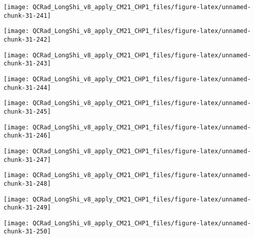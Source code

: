 \documentclass[
  10pt,
  a4paper,oneside]{article}
\begin{document}
\begin{center}\texttt{[image: QCRad\_LongShi\_v8\_apply\_CM21\_CHP1\_files/figure-latex/unnamed-chunk-31-241]} \end{center}

\begin{center}\texttt{[image: QCRad\_LongShi\_v8\_apply\_CM21\_CHP1\_files/figure-latex/unnamed-chunk-31-242]} \end{center}

\begin{center}\texttt{[image: QCRad\_LongShi\_v8\_apply\_CM21\_CHP1\_files/figure-latex/unnamed-chunk-31-243]} \end{center}

\begin{center}\texttt{[image: QCRad\_LongShi\_v8\_apply\_CM21\_CHP1\_files/figure-latex/unnamed-chunk-31-244]} \end{center}

\begin{center}\texttt{[image: QCRad\_LongShi\_v8\_apply\_CM21\_CHP1\_files/figure-latex/unnamed-chunk-31-245]} \end{center}

\begin{center}\texttt{[image: QCRad\_LongShi\_v8\_apply\_CM21\_CHP1\_files/figure-latex/unnamed-chunk-31-246]} \end{center}

\begin{center}\texttt{[image: QCRad\_LongShi\_v8\_apply\_CM21\_CHP1\_files/figure-latex/unnamed-chunk-31-247]} \end{center}

\begin{center}\texttt{[image: QCRad\_LongShi\_v8\_apply\_CM21\_CHP1\_files/figure-latex/unnamed-chunk-31-248]} \end{center}

\begin{center}\texttt{[image: QCRad\_LongShi\_v8\_apply\_CM21\_CHP1\_files/figure-latex/unnamed-chunk-31-249]} \end{center}

\begin{center}\texttt{[image: QCRad\_LongShi\_v8\_apply\_CM21\_CHP1\_files/figure-latex/unnamed-chunk-31-250]} \end{center}
\end{document}
